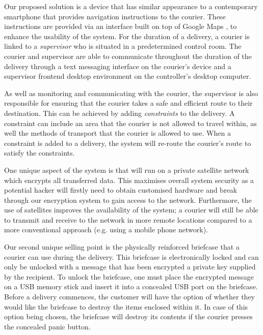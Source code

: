 

Our proposed solution is a device that has similar appearance to a contemporary smartphone that provides navigation instructions to the courier. These instructions are provided via an interface built on top of Google Maps \cite{GoogleMaps}, to enhance the usability of the system. For the duration of a delivery, a courier is linked to a \textit{supervisor} who is situated in a predetermined control room. The courier and supervisor are able to communicate throughout the duration of the delivery through a text messaging interface on the courier’s device and a supervisor frontend desktop environment on the controller’s desktop computer.

As well as monitoring and communicating with the courier, the supervisor is also responsible for ensuring that the courier takes a safe and efficient route to their destination. This can be achieved by adding \textit{constraints} to the delivery. A constraint can include an area that the courier is not allowed to travel within, as well the methods of transport that the courier is allowed to use. When a constraint is added to a delivery, the system will re-route the courier's route to satisfy the constraints.

One unique aspect of the system is that will run on a private satellite network which encrypts all transferred data. This maximises overall system security as a potential hacker will firstly need to obtain customised hardware and break through our encryption system to gain access to the network. Furthermore, the use of satellites improves the availability of the system; a courier will still be able to transmit and receive to the network in more remote locations compared to a more conventional approach (e.g. using a mobile phone network).

Our second unique selling point is the physically reinforced briefcase that a courier can use during the delivery. This briefcase is electronically locked and can only be unlocked with a message that has been encrypted a private key supplied by the recipient. To unlock the briefcase, one must place the encrypted message on a USB memory stick and insert it into a concealed USB port on the briefcase. Before a delivery commences, the customer will have the option of whether they would like the briefcase to destroy the items enclosed within it. In case of this option being chosen, the briefcase will destroy its contents if the courier presses the concealed panic button.

